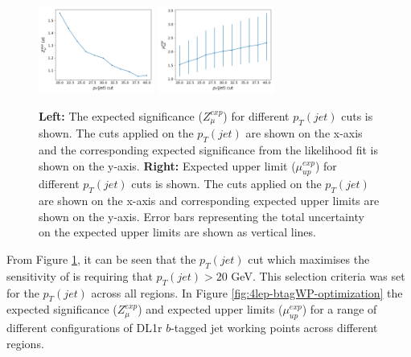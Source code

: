 \begin{figure}[h!]
	\includegraphics[width = 0.34\textwidth]{figures/signif_jetPt.png}
  	\includegraphics[width = 0.34\textwidth]{figures/exp_upper_jetPt.png}
  \centering
	\caption{\textbf{Left:} The expected significance ($Z_{\mu}^{exp}$) for different $p_{T}(jet)$ cuts is shown. The cuts applied on the $p_{T}(jet)$ are shown on the x-axis and the corresponding expected significance from the likelihood fit is shown on the y-axis. \textbf{Right:} Expected upper limit ($\mu_{up}^{exp}$) for different $p_{T}(jet)$ cuts is shown. The cuts applied on the $p_{T}(jet)$ are shown on the x-axis and corresponding expected upper limits are shown on the y-axis. Error bars representing the total uncertainty on the expected upper limits are shown as vertical lines.}
		\label{fig:4lep-jetpt-optimisation}
\end{figure}From Figure \ref{fig:4lep-jetpt-optimisation}, it can be seen that the $p_{T}(jet)$ cut which maximises the sensitivity of \tWZ is requiring that $p_{T}(jet) > 20$ GeV. This selection criteria was set for the $p_{T}(jet)$ across all regions. In Figure \ref{fig:4lep-btagWP-optimization} the expected significance ($Z_{\mu}^{exp}$) and expected upper limits ($\mu_{up}^{exp}$) for a range of different configurations of DL1r $b$-tagged jet working points across different regions.
